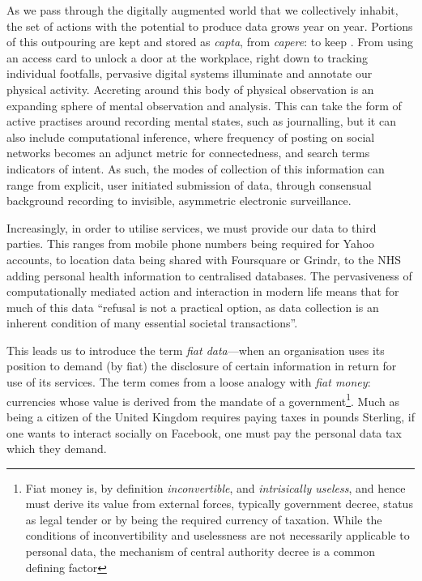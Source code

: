 \documentclass{IOS-Book-Article}     %
\begin{document}
As we pass through the digitally augmented world that we collectively inhabit,
the set of actions with the potential to produce data grows year on year.
Portions of this outpouring are kept and stored as
\emph{capta}, from \emph{capere}: to keep \cite{dodge2005codes}. From
using an access card to unlock a door at the workplace, right down to tracking
individual footfalls, pervasive digital systems illuminate and annotate our
physical activity. Accreting around this body of physical observation is an
expanding sphere of mental observation and analysis. This can take the form of
active practises around recording mental states, such as journalling, but it can
also include computational inference, where frequency of posting on social
networks becomes an adjunct metric for connectedness, and search terms 
indicators of intent. As such, the modes of collection of this information can
range from explicit, user initiated submission of data, through consensual
background recording to invisible, asymmetric electronic surveillance.

Increasingly, in order to utilise services, we must provide our data to third
parties. This ranges from mobile phone numbers being required for Yahoo
accounts, to location data being shared with Foursquare or Grindr, to the NHS
adding personal health information to centralised databases. 
The pervasiveness of computationally mediated action and interaction in modern
life means that for much of this data ``refusal is not a practical option, as
data collection is an inherent condition of many essential societal
transactions''\cite{brunton2011vernacular}. 

This leads us to introduce the term 
\emph{fiat data}---when an
organisation uses its position to demand (by fiat) the disclosure of certain
information in return for use of its services. The term comes from a loose
analogy with \emph{fiat money}: currencies whose value is derived from the
mandate of a government\footnote{Fiat money is, by definition
\emph{inconvertible}, and \emph{intrisically useless}, and hence must derive
its value from external forces, typically government decree, status as legal
tender or by being the required currency of taxation. While the conditions of
inconvertibility and uselessness are not necessarily applicable to personal
data, the mechanism of central authority decree is a common defining factor}. 
Much as being a citizen of the United Kingdom requires paying taxes in pounds
Sterling, if one wants to interact socially on Facebook, one must pay the
personal data tax which they demand. 
\end{document}
